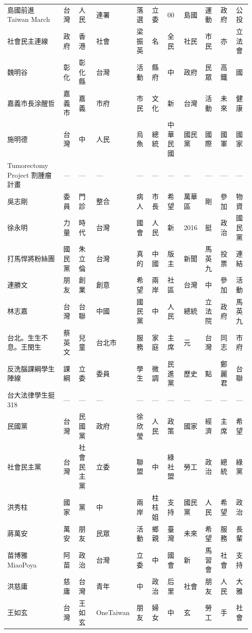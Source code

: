 \documentclass[a4paper, 10pt, conference]{ieeeconf}       %
\begin{document}
\begin{CJK}{UTF8}{bsmi}
\begin{longtable}[c]{@{}L{2.45cm}L{1.1cm}L{1.1cm}L{1.1cm}L{1.1cm}L{1.1cm}L{1.1cm}L{1.1cm}L{1.41cm}L{1.1cm}L{1.1cm}@{}}
島國前進 Taiwan March & 台灣 & 人民 & 連署 & 落選 & 立委 & 00 & 島國 & 運動 & 政府 & 公投 \\
社會民主連線 & 政府 & 香港 & 社會 & 梁振英 & 名 & 全民 & 社民 & 市民 & 亦 & 立法會 \\
魏明谷 & 彰化 & 彰化縣 & 台灣 & 活動 & 縣府 & 中 & 政府 & 民眾 & 高鐵 & 國 \\
嘉義市長涂醒哲 & 嘉義市 & 嘉義 & 市府 & 市民 & 文化 & 新 & 台灣 & 活動 & 未來 & 健康 \\
施明德 & 台灣 & 中 & 人民 & 烏魚 & 總統 & 中華民國 & 國民黨 & 國際 & 國軍 & 國家 \\
Tumorectomy Project 割腫瘤計畫 & --- & --- & --- & --- & --- & --- & --- & --- & --- & --- \\
吳志剛 & 委員 & 門診 & 整合 & 病人 & 市長 & 希望 & 萬華區 & 剛 & 參加 & 物資 \\
徐永明 & 力量 & 時代 & 台灣 & 國會 & 人民 & 新 & 2016 & 挺 & 政治 & 國民黨 \\
打馬悍將粉絲團 & 國民黨 & 朱立倫 & 台灣 & 真的 & 中國 & 版主 & 新聞 & 馬英九 & 投票 & 連結 \\
連勝文 & 朋友 & 創業 & 創意 & 希望 & 兩岸 & 社區 & 台灣 & 中 & 參加 & 活動 \\
林志嘉 & 台灣 & 台聯 & 中國 & 國民黨 & 中 & 人民 & 總統 & 立法院 & 政府 & 馬英九 \\
台北。生生不息。王閔生 & 蔡英文 & 兒童 & 台北市 & 服務 & 家庭 & 主席 & 元 & 台灣 & 同志 & 市府 \\
反洗腦課綱學生陣線 & 課綱 & 立委 & 委員 & 學生 & 微調 & 民進黨 & 歷史 & 點 & 鄭麗君 & 台聯 \\
台大法律學生挺318 & --- & --- & --- & --- & --- & --- & --- & --- & --- & --- \\
民國黨 & 台灣 & 民國黨 & 政府 & 徐欣瑩 & 人民 & 政策 & 國家 & 經濟 & 主席 & 希望 \\
社會民主黨 & 台灣 & 社會民主黨 & 立委 & 聯盟 & 中 & 綠社盟 & 勞工 & 政治 & 總統 & 綠黨 \\
洪秀柱 & 國家 & 黨 & 中 & 兩岸 & 柱柱姐 & 支持 & 國民黨 & 人民 & 希望 & 政治 \\
蔣萬安 & 萬安 & 朋友 & 民眾 & 活動 & 鄉親 & 臺灣 & 未來 & 希望 & 服務 & 長輩 \\
苗博雅 MiaoPoya & 阿苗 & 政治 & 台灣 & 立委 & 中 & 國會 & 新 & 馬習會 & 社會 & 支持 \\
洪慈庸 & 慈庸 & 台灣 & 青年 & 中 & 政治 & 后里 & 社會 & 朋友 & 人民 & 大雅 \\
王如玄 & 台灣 & 王如玄 & OneTaiwan & 朋友 & 婦女 & 中 & 玄 & 勞工 & 手 & 社會 \\

\end{longtable}
\end{CJK}
\end{document}
